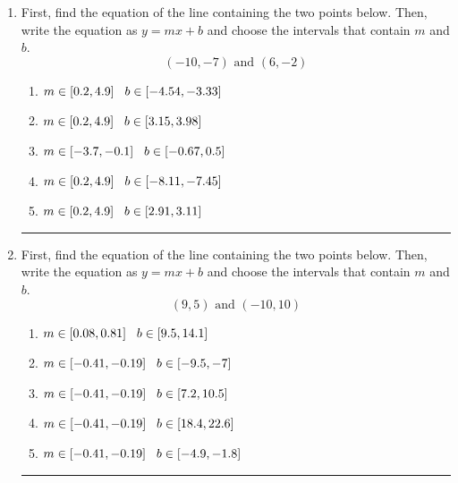 \documentclass[14pt]{extbook}
\newcommand{\litem}[1]{\item#1\hspace*{-1cm}\rule{\textwidth}{0.4pt}}
\begin{document}
\begin{enumerate}
{\begin{enumerate}[label=\Alph*.]
\end{enumerate} }
\litem{
First, find the equation of the line containing the two points below. Then, write the equation as $ y=mx+b $ and choose the intervals that contain $m$ and $b$.\[ (-10, -7) \text{ and } (6, -2) \]\begin{enumerate}[label=\Alph*.]
\item \( m \in [0.2, 4.9] \hspace*{3mm} b \in [-4.54, -3.33] \)
\item \( m \in [0.2, 4.9] \hspace*{3mm} b \in [3.15, 3.98] \)
\item \( m \in [-3.7, -0.1] \hspace*{3mm} b \in [-0.67, 0.5] \)
\item \( m \in [0.2, 4.9] \hspace*{3mm} b \in [-8.11, -7.45] \)
\item \( m \in [0.2, 4.9] \hspace*{3mm} b \in [2.91, 3.11] \)

\end{enumerate} }
\litem{
First, find the equation of the line containing the two points below. Then, write the equation as $ y=mx+b $ and choose the intervals that contain $m$ and $b$.\[ (9, 5) \text{ and } (-10, 10) \]\begin{enumerate}[label=\Alph*.]
\item \( m \in [0.08, 0.81] \hspace*{3mm} b \in [9.5, 14.1] \)
\item \( m \in [-0.41, -0.19] \hspace*{3mm} b \in [-9.5, -7] \)
\item \( m \in [-0.41, -0.19] \hspace*{3mm} b \in [7.2, 10.5] \)
\item \( m \in [-0.41, -0.19] \hspace*{3mm} b \in [18.4, 22.6] \)
\item \( m \in [-0.41, -0.19] \hspace*{3mm} b \in [-4.9, -1.8] \)


\end{enumerate}}
\end{enumerate}
\end{document}
